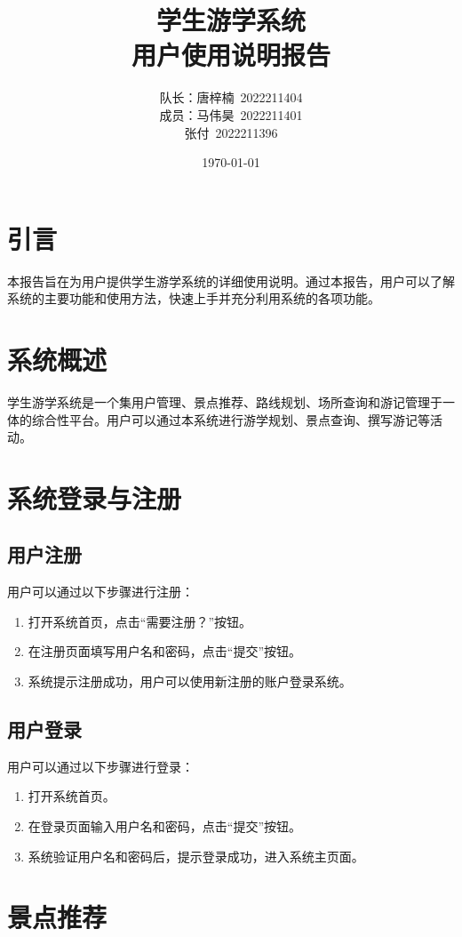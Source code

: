 \documentclass{ctexart}
\title{学生游学系统 \\ 用户使用说明报告}
\author{队长：唐梓楠\ 2022211404 \\ 成员：马伟昊\ 2022211401 \\ 张付\ 2022211396}
\date{\today}
\begin{document}
\maketitle

\tableofcontents

\newpage

\section{引言}
本报告旨在为用户提供学生游学系统的详细使用说明。通过本报告，用户可以了解系统的主要功能和使用方法，快速上手并充分利用系统的各项功能。

\section{系统概述}
学生游学系统是一个集用户管理、景点推荐、路线规划、场所查询和游记管理于一体的综合性平台。用户可以通过本系统进行游学规划、景点查询、撰写游记等活动。

\section{系统登录与注册}

\subsection{用户注册}
用户可以通过以下步骤进行注册：
\begin{enumerate}
    \item 打开系统首页，点击``需要注册？''按钮。
    \item 在注册页面填写用户名和密码，点击“提交”按钮。
    \item 系统提示注册成功，用户可以使用新注册的账户登录系统。
\end{enumerate}

\subsection{用户登录}
用户可以通过以下步骤进行登录：
\begin{enumerate}
    \item 打开系统首页。
    \item 在登录页面输入用户名和密码，点击“提交”按钮。
    \item 系统验证用户名和密码后，提示登录成功，进入系统主页面。
\end{enumerate}

\section{景点推荐}
\end{document}
